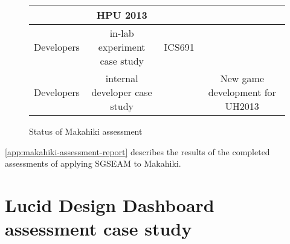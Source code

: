 \begin{figure}[ht!]
\begin{tabular}{|c|c|c|c|}
    \multicolumn{1}{|p{0.2\columnwidth}|}{} &
    \multicolumn{1}{|p{0.2\columnwidth}|}{HPU 2013} \\
    \hline
    \multicolumn{1}{|p{0.2\columnwidth}|}{Developers} &
    \multicolumn{1}{|p{0.3\columnwidth}|}{in-lab experiment case study} &
    \multicolumn{1}{|p{0.2\columnwidth}|}{ICS691} &
    \multicolumn{1}{|p{0.2\columnwidth}|}{} \\
    \hline
    \multicolumn{1}{|p{0.2\columnwidth}|}{Developers} &
    \multicolumn{1}{|p{0.3\columnwidth}|}{internal developer case study} &
    \multicolumn{1}{|p{0.2\columnwidth}|}{} &
    \multicolumn{1}{|p{0.2\columnwidth}|}{New game development for UH2013} \\
    \hline
  \end{tabular}
  \caption{Status of Makahiki assessment}
  \label{fig:assessment-overview}
\end{figure}


\autoref{app:makahiki-assessment-report} describes the results of the completed assessments of applying SGSEAM to Makahiki.

\section{Lucid Design Dashboard assessment case study}

